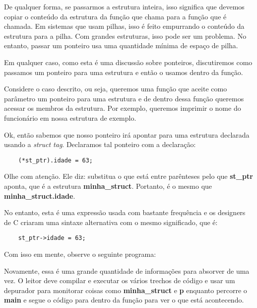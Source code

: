 De qualquer forma, se passarmos a estrutura inteira, isso significa que devemos copiar o conteúdo da estrutura da função que chama para a função que é chamada. Em sistemas que usam pilhas, isso é feito empurrando o conteúdo da estrutura para a pilha. Com grandes estruturas, isso pode ser um problema. No entanto, passar um ponteiro usa uma quantidade mínima de espaço de pilha.

Em qualquer caso, como esta é uma discussão sobre ponteiros, discutiremos como passamos um ponteiro para uma estrutura e então o usamos dentro da função.

Considere o caso descrito, ou seja, queremos uma função que aceite como parâmetro um ponteiro para uma estrutura e de dentro dessa função queremos acessar os membros da estrutura. Por exemplo, queremos imprimir o nome do funcionário em nossa estrutura de exemplo.

Ok, então sabemos que nosso ponteiro irá apontar para uma estrutura declarada usando a \textit{struct tag}. Declaramos tal ponteiro com a declaração:
\begin{lstlisting}
	(*st_ptr).idade = 63;
\end{lstlisting}

Olhe com atenção. Ele diz: substitua o que está entre parênteses pelo que \textbf{st\_ptr} aponta, que é a estrutura \textbf{minha\_struct}. Portanto, é o mesmo que \textbf{minha\_struct.idade}.

No entanto, esta é uma expressão usada com bastante frequência e os designers de C criaram uma sintaxe alternativa com o mesmo significado, que é:
\begin{lstlisting}
	st_ptr->idade = 63;
\end{lstlisting}

Com isso em mente, observe o seguinte programa:


Novamente, essa é uma grande quantidade de informações para absorver de uma vez. O leitor deve compilar e executar os vários trechos de código e usar um depurador para monitorar coisas como \textbf{minha\_struct} e \textbf{p} enquanto percorre o \textbf{main} e segue o código para dentro da função para ver o que está acontecendo.